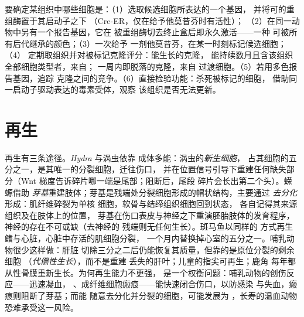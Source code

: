 \begin{method}[谱系追踪]\label{met:b3:stem-cells:tracing}
要确定某组织中哪些细胞是：（1）选取候选细胞所表达的一个基因，
并将可的重组酶置于其启动子之下
（Cre-ER，仅在给予他莫昔芬时有活性）；
（2）在同一动物中另有一个报告基因，它在
被重组酶切去终止盒后即永久激活——一种
可被所有后代继承的颜色；（3）一次给予
一剂他莫昔芬，在某一时刻标记候选细胞；（4）
定期取组织并对被标记克隆评分：能生长的克隆，
能持续数月且含该组织全部细胞类型者，来自；
一周内即脱落的克隆，来自
过渡细胞。（5）若用多色报告基因，追踪
克隆之间的竞争。（6）直接检验功能：杀死被标记的细胞，
借助同一启动子驱动表达的毒素受体，观察
该组织是否无法更新。
\end{method}

\section{再生}

\begin{definition}[动物如何再生]\label{def:b3:stem-cells:regeneration}
再生有三条途径。\emph{Hydra} 与涡虫依靠
成体多能：涡虫的\emph{新生细胞}，
占其细胞的五分之一，是其唯一的分裂细胞，迁往伤口，
并在位置信号引导下重建任何缺失部分（Wnt
梯度告诉碎片哪一端是尾部；阻断后，尾段
碎片会长出第二个头）。蝾螈借助
\emph{芽基}重建肢体；芽基是残端处分裂细胞形成的帽状结构，主要通过
\emph{去分化}形成：肌纤维碎裂为单核
细胞，软骨与结缔组织细胞回到状态，
各自记得其来源组织及在肢体上的位置，
芽基在伤口表皮与神经之下重演胚胎肢体的发育程序，
神经的存在不可或缺（去神经的
残端则无任何生长）。斑马鱼以同样的
方式再生鳍与心脏，心脏中存活的肌细胞分裂，
一个月内替换掉心室的五分之一。哺乳动物很少这样做：肝脏
切除三分之二后仍能恢复其质量，但靠的是原位分裂的剩余细胞
（\emph{代偿性生长}），而不是重建
丢失的肝叶；儿童的指尖可再生；鹿角
每年都从性骨膜重新生长。为何再生能力不更强，
是一个权衡问题：哺乳动物的创伤反应——迅速凝血，
、成纤维细胞瘢痕——能快速闭合伤口，以防感染
与失血，瘢痕则阻断了芽基；而能
随意去分化并分裂的细胞，可能发展为
，长寿的温血动物恐难承受这一风险。
\end{definition}

